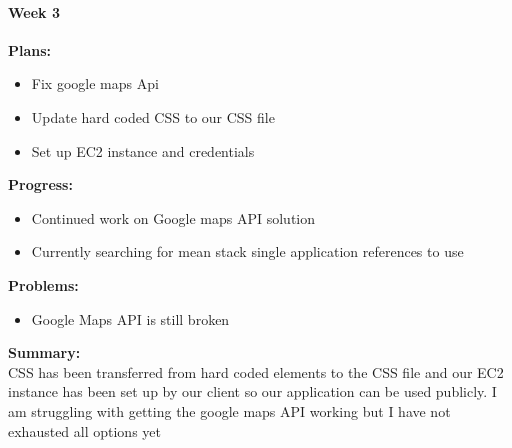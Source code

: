 \paragraph{Week 3}
\begin{adjustwidth}{2.5em}{0pt}
    \vspace{-0.5cm}\textbf{Plans:}
    \vspace{-0.5cm}
    \begin{itemize}
        \item Fix google maps Api
        \item Update hard coded CSS to our CSS file
        \item Set up EC2 instance and credentials
    \end{itemize} 
    \vspace{-0.3cm}\textbf{Progress:}
    \vspace{-0.5cm}
    \begin{itemize}
        \item Continued work on Google maps API solution
        \item Currently searching for mean stack single application references to use    
	\end{itemize} 
    \vspace{-0.3cm}\textbf{Problems:}
    \vspace{-0.5cm}
    \begin{itemize}
        \item Google Maps API is still broken
    \end{itemize}  
    \vspace{-0.3cm}\noindent\textbf{Summary:}\\
    \noindent CSS has been transferred from hard coded elements to the CSS file and our EC2 instance has been set up by our client so our application can be used publicly. I am struggling with getting the google maps API working but I have not exhausted all options yet
	\end{adjustwidth} 
